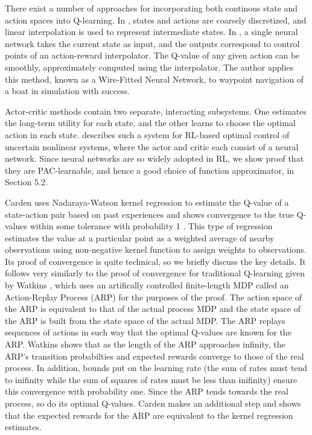 \documentclass{article} %
\begin{document}
There exist a number of approaches for incorporating both continous state and action spaces into Q-learning.  In \cite{takahashi}, states and actions are coarsely discretized, and linear interpolation is used to represent intermediate states.  In \cite{gaskett_thesis}, a single neural network takes the current state as input, and the outputs correspond to control points of an action-reward interpolator.  The Q-value of any given action can be smoothly, approximately computed using the interpolator.  The author applies this method, known as a Wire-Fitted Neural Network, to waypoint navigation of a boat in simulation with success.

Actor-critic methods contain two separate, interacting subsystems.  One estimates the long-term utility for each state, and the other learns to choose the optimal action in each state.  \cite{bhasin_reinforcement_2011} describes such a system for RL-based optimal control of uncertain nonlinear systems, where the actor and critic each consist of a neural network.  Since neural networks are so widely adopted in RL, we show proof that they are PAC-learnable, and hence a good choice of function approximator, in Section 5.2.

Carden uses Nadaraya-Watson kernel regression \cite{nadaraya} to estimate the Q-value of a state-action pair based on past experiences and shows convergence to the true Q-values within some tolerance with probability 1 \cite{carden2014}.  This type of regression estimates the value at a particular point as a weighted average of nearby observations using non-negative kernel function to assign weights to observations.  Its proof of convergence is quite technical, so we briefly discuss the key details.  It follows very similarly to the proof of convergence for traditional Q-learning given by Watkins \cite{watkins}, which uses an artifically controlled finite-length MDP called an Action-Replay Process (ARP) for the purposes of the proof.  The action space of the ARP is equivalent to that of the actual process MDP and the state space of the ARP is built from the state space of the actual MDP. The ARP replays sequences of actions in such way that the optimal Q-values are known for the ARP. Watkins shows that as the length of the ARP approaches infinity, the ARP's transition probabilties and expected rewards converge to those of the real process.  In addition, bounds put on the learning rate (the sum of rates must tend to inifinity while the sum of squares of rates must be less than inifinity) ensure this convergence with probability one.  Since the ARP tends towards the real process, so do its optimal Q-values.  Carden makes an additional step and shows that the expected rewards for the ARP are equivalent to the kernel regression estimates.
\end{document}
